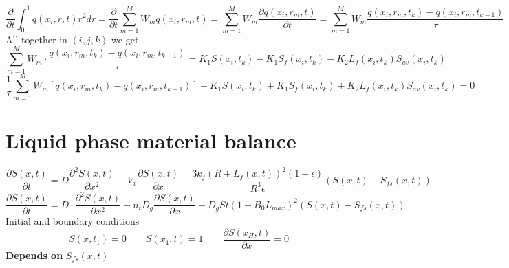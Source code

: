 \documentclass[12pt]{article}
\begin{document}
\begin{equation}
\frac{\partial}{\partial t} \int_{0}^{1}q(x_i,r,t)r^2dr=
\frac{\partial}{\partial t} \sum_{m=1}^{M} W_m q(x_i,r_m,t)=
\sum_{m=1}^{M} W_m  \frac{\partial q(x_i,r_m,t)}{\partial t}=
\sum_{m=1}^{M} W_m  \frac{q(x_i,r_m,t_k) - q(x_i,r_m,t_{k-1})}{\tau}
\end{equation}
All together in  $(i, j, k)$ we get
\begin{equation}
\sum_{m=1}^{M} W_m \cdot \frac{q(x_i,r_m,t_k) - q(x_i,r_m,t_{k-1})}{\tau}=
K_1S(x_i,t_k)-K_1S_f(x_i,t_k)-K_2L_f(x_i,t_k)S_{av}(x_i,t_k)
\end{equation}
\begin{equation}
\frac{1}{\tau}\sum_{m=1}^{M} W_m[q(x_i,r_m,t_k) - q(x_i,r_m,t_{k-1})] -K_1S(x_i,t_k)+K_1S_f(x_i,t_k)+K_2L_f(x_i,t_k)S_{av}(x_i,t_k)=0
\end{equation}

\section{Liquid phase material balance}
\begin{equation}
\dfrac{\partial S(x,t)}{\partial t}=D\dfrac{\partial^2 S(x,t)}{\partial x^2}-V_x\dfrac{\partial S(x,t)}{\partial x}-\frac{3k_f(R+L_f(x,t))^2(1-\epsilon)}{R^3 \epsilon}(S(x,t)-S_{fs}(x,t))
\end{equation}
\begin{equation}
\dfrac{\partial S(x,t)}{\partial t}=D\cdot\dfrac{\partial^2 S(x,t)}{\partial x^2}-n_tD_g\dfrac{\partial S(x,t)}{\partial x}-D_gSt(1+B_0L_{max})^2(S(x,t)-S_{fs}(x,t))
\end{equation}
Initial and boundary conditions
\begin{equation}\label{eq:liqPhaseB}
	S(x, t_1) = 0
	\qquad
	S(x_1, t) = 1 
	\qquad
	\dfrac{\partial S(x_H,t)}{\partial x}=0
\end{equation}
\textbf{Depends on} $S_{fs}(x, t)$\\
\end{document}
